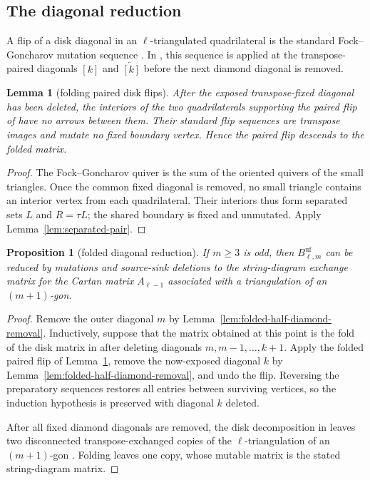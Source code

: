 \documentclass[11pt]{amsart}
\newtheorem{proposition}[theorem]{Proposition}
\newtheorem{lemma}[theorem]{Lemma}
\theoremstyle{definition}
\theoremstyle{remark}
\begin{document}
\subsection{The diagonal reduction}

A flip of a disk diagonal in an $\ell$-triangulated quadrilateral is the
standard Fock--Goncharov mutation sequence
\cite[Section~10.3 and Proposition~10.1]{FockGoncharov}.  In
\cite[Step~2 in the proof of Theorem~6.22]{FeiKroneckerII}, this sequence is
applied at the transpose-paired diagonals $[k]$ and
$\overleftarrow{[k]}$ before the next diamond diagonal is removed.

\begin{lemma}[folding paired disk flips]
\label{lem:flip-support-separation}
After the exposed transpose-fixed diagonal has been deleted, the interiors
of the two quadrilaterals supporting the paired flip of \cite{FeiKroneckerII} have no arrows
between them.  Their standard flip sequences are transpose images and mutate no fixed
boundary vertex.  Hence the paired flip descends to the folded
matrix.
\end{lemma}

\begin{proof}
The Fock--Goncharov quiver is the sum of the oriented quivers of the small
triangles.  Once the common fixed diagonal is removed, no small triangle
contains an interior vertex from each quadrilateral.  Their interiors thus
form separated sets $L$ and $R=\tau L$; the shared boundary is fixed and
unmutated.  Apply Lemma~\ref{lem:separated-pair}.
\end{proof}

\begin{proposition}[folded diagonal reduction]
\label{prop:direct-folded-diagonal-reduction}
If $m\ge3$ is odd, then $B_{\ell,m}^{\mathrm{uf}}$ can be reduced by
mutations and source-sink deletions to the string-diagram exchange matrix
for the Cartan matrix $A_{\ell-1}$ associated with a triangulation of an
$(m+1)$-gon.
\end{proposition}

\begin{proof}
Remove the outer diagonal $m$ by
Lemma~\ref{lem:folded-half-diamond-removal}.  Inductively, suppose that the
matrix obtained at this point is the fold of the disk matrix in \cite{FeiKroneckerII}
after deleting diagonals
$m,m-1,\ldots,k+1$.  Apply the folded paired flip of
Lemma~\ref{lem:flip-support-separation}, remove the now-exposed diagonal $k$ by
Lemma~\ref{lem:folded-half-diamond-removal}, and undo the flip.  Reversing the preparatory sequences restores all entries between surviving
vertices, so the
induction hypothesis is preserved with diagonal $k$ deleted.

After all fixed diamond diagonals are removed, the disk decomposition in
\cite{FeiKroneckerII}
leaves two disconnected transpose-exchanged copies of the
$\ell$-triangulation of an $(m+1)$-gon
\cite[Step~3 in the proof of Theorem~6.22]{FeiKroneckerII}.  Folding leaves
one copy, whose mutable matrix is the stated string-diagram matrix.
\end{proof}
\end{document}
